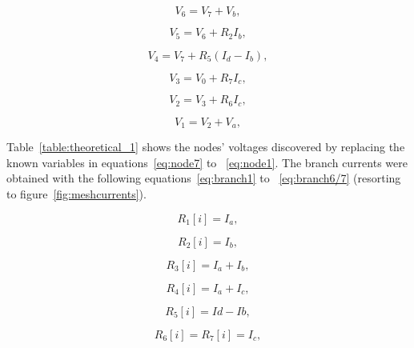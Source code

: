 \begin{equation}
  V_{6} = V_{7} + V_{b},
  \label{eq:node6}
\end{equation}

\begin{equation}
  V_{5} = V_{6} + R_{2}I_{b},
  \label{eq:node5}
\end{equation}

\begin{equation}
  V_{4} = V_{7} + R_{5}(I_{d} - I_{b}),
  \label{eq:node4}
\end{equation}

\begin{equation}
  V_{3} = V_{0} + R_{7}I_{c},
  \label{eq:node3}
\end{equation}

\begin{equation}
  V_{2} = V_{3} + R_{6}I_{c},
  \label{eq:node2}
\end{equation}

\begin{equation}
  V_{1} = V_{2} + V_{a},
  \label{eq:node1}
\end{equation}

Table~\ref{table:theoretical_1} shows the nodes' voltages discovered by replacing the known variables in equations~\ref{eq:node7} to ~\ref{eq:node1}. The branch currents were obtained with the following equations~\ref{eq:branch1} to ~\ref{eq:branch6/7} (resorting to figure~\ref{fig:meshcurrents}).

\begin{equation}
  R_1[i] = I_a,
  \label{eq:branch1}
\end{equation}

\begin{equation}
  R_2[i]= I_b,
  \label{eq:branch2}
\end{equation}

\begin{equation}
  R_3[i] = I_a + I_b,
  \label{eq:branch3}
\end{equation}

\begin{equation}
  R_4[i] = I_a + I_c,
  \label{eq:branch4}
\end{equation}

\begin{equation}
  R_5[i] = Id - Ib,
  \label{eq:branch5}
\end{equation}

\begin{equation}
  R_6[i] = R_7[i] = I_c,
  \label{eq:branch6/7}
\end{equation}



